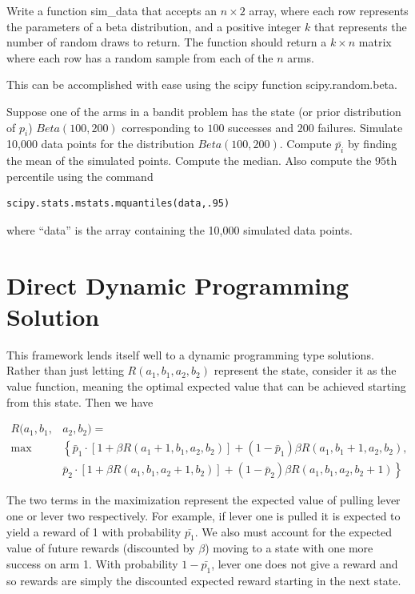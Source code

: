 \begin{problem}
Write a function sim\_data that accepts an $n\times 2$ array, where each row represents the parameters of a beta distribution, and a positive integer $k$ that represents the number of random draws to return.  The function should return a $k\times n$ matrix where each row has a random sample from each of the $n$ arms.

This can be accomplished with ease using the scipy function scipy.random.beta.
\end{problem}

\begin{problem}
Suppose one of the arms in a bandit problem has the state (or prior distribution of $p_i$) $Beta(100,200)$ corresponding to $100$ successes and $200$ failures.  Simulate 10,000 data points for the distribution $Beta(100,200)$.  Compute $\bar{p_i}$ by finding the mean of the simulated points.  Compute the median.  Also compute the $95$th percentile using the command

\begin{lstlisting}[style = python]
scipy.stats.mstats.mquantiles(data,.95)
\end{lstlisting}
where ``data'' is the array containing the 10,000 simulated data points.
\end{problem}

\section*{Direct Dynamic Programming Solution}
This framework lends itself well to a dynamic programming type solutions.  Rather than just letting $R(a_1,b_1,a_2,b_2)$ represent the state, consider it as the value function, meaning the optimal expected value that can be achieved starting from this state.  Then we have

\begin{equation}\label{recurs}
\begin{aligned}
R(a_1,b_1,&a_2,b_2) =\\
 \max&\left\{\bar{p}_1\cdot[1 + \beta R(a_1+1,b_1,a_2,b_2)] + (1-\bar{p}_1)\beta R(a_1,b_1+1,a_2,b_2)\right. ,\\
&  \left.\bar{p}_2\cdot[1 + \beta R(a_1,b_1,a_2+1,b_2)] + (1-\bar{p}_2)\beta R(a_1,b_1,a_2,b_2+1)\right\}
\end{aligned}
\end{equation}

The two terms in the maximization represent the expected value of pulling lever one or lever two respectively.  For example, if lever one is pulled it is expected to yield a reward of 1 with probability $\bar{p_1}$.  We also must account for the expected value of future rewards (discounted by $\beta$) moving to a state with one more success on arm 1.  With probability $1-\bar{p_1}$, lever one does not give a reward and so rewards are simply the discounted expected reward starting in the next state.

